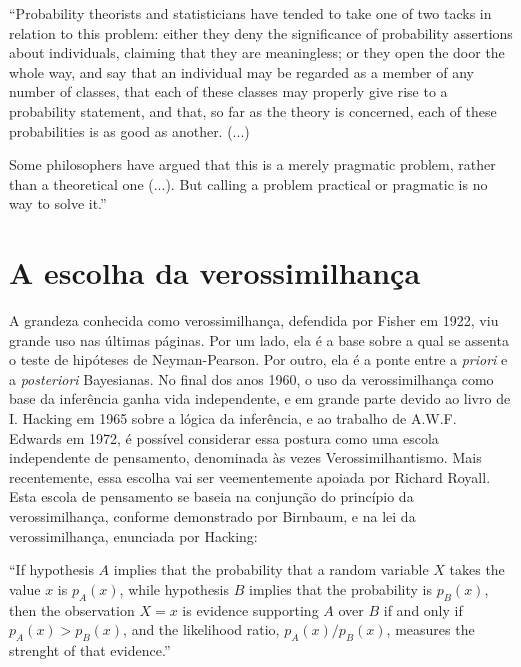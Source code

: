 \begin{shaded}
``Probability theorists and statisticians have tended to take one of two tacks in relation to this problem:
either they deny the significance of probability assertions about individuals, claiming that they are meaningless;
or they open the door the whole way, and say that an individual may be regarded as a member of any number of classes, 
that each of these classes may properly give rise to a probability statement, and that, so far as the theory is concerned,
each of these probabilities is as good as another. (...)

Some philosophers have argued that this is a merely pragmatic problem, rather than a theoretical one (...). But calling
a problem practical or pragmatic is no way to solve it.'' \citep{Kyburg74}


\end{shaded}

\section{A escolha da verossimilhança}\label{sec:likelihood}

A grandeza conhecida como verossimilhança, defendida por Fisher em 1922, viu grande uso nas últimas páginas. Por um lado,
ela é a base sobre a qual se assenta o teste de hipóteses de Neyman-Pearson. Por outro, ela é a ponte entre a {\em priori}
e a {\em posteriori} Bayesianas. No final dos anos 1960, o uso da verossimilhança como base da inferência ganha vida 
independente, e em grande parte devido ao livro de I. Hacking em 1965 sobre a lógica da inferência, 
e ao trabalho de A.W.F. Edwards em 1972, é possível considerar essa postura como
uma escola independente de pensamento, denominada às vezes Verossimilhantismo. Mais recentemente, essa escolha vai ser
veementemente apoiada por Richard Royall. Esta escola de pensamento se baseia na conjunção do princípio da 
verossimilhança, conforme demonstrado por Birnbaum, e na lei da verossimilhança, enunciada por Hacking:

``If hypothesis $A$ implies that the probability that a random variable $X$ takes the value $x$ is $p_A(x)$, while
hypothesis $B$ implies that the probability is $p_B(x)$, then the observation $X=x$ is evidence supporting $A$ over $B$
if and only if $p_A(x) > p_B(x)$, and the likelihood ratio, $p_A(x)/p_B(x)$, measures the strenght of that evidence.''
\citep{Hacking65}

